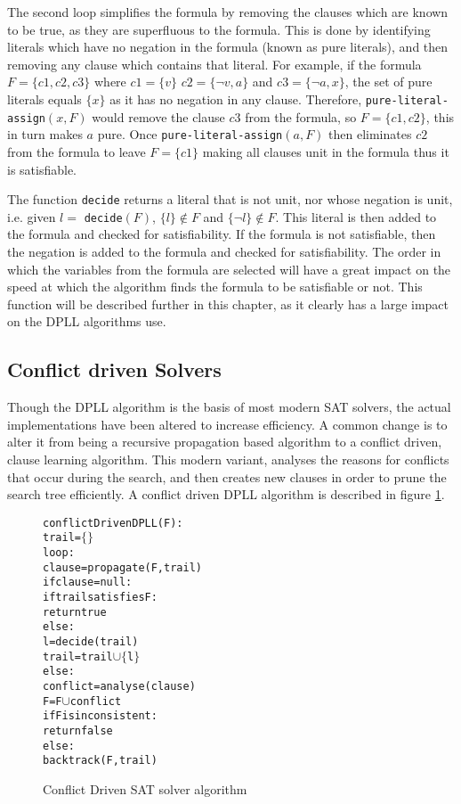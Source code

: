 The second loop simplifies the formula by removing the clauses which are known to be true, as they are superfluous to the formula.
This is done by identifying literals which have no negation in the formula (known as pure literals), and then removing any clause which contains that literal.
For example, if the formula $F = \{c1,c2,c3\}$ where $c1 = \{v\}$ $c2 = \{\neg v, a\}$ and $c3 = \{\neg a , x\}$, 
the set of pure literals equals $\{x\}$ as it has no negation in any clause.
Therefore, \verb+pure-literal-assign+$(x,F)$ would remove the clause $c3$ from the formula, so $F = \{c1,c2\}$, this in turn makes $a$ pure.
Once \verb+pure-literal-assign+$(a,F)$ then eliminates $c2$ from the formula to leave $F= \{c1\}$ making all clauses unit in the formula thus it is satisfiable.

The function \verb+decide+ returns a literal that is not unit, nor whose negation is unit, i.e. given $l =$ \verb+decide+$(F)$, $\{l\} \not \in F$ and $\{\neg l\} \not \in F$.
This literal is then added to the formula and checked for satisfiability.
If the formula is not satisfiable, then the negation is added to the formula and checked for satisfiability.  
The order in which the variables from the formula are selected will have a great impact on the speed at which the algorithm finds the formula to be satisfiable or not.
This function will be described further in this chapter, as it clearly has a large impact on the DPLL algorithms use.


\subsection{Conflict driven Solvers}
Though the DPLL algorithm is the basis of most modern SAT solvers, the actual implementations have been altered to increase efficiency.
A common change is to alter it from being a recursive propagation based algorithm to a conflict driven, clause learning algorithm.
This modern variant, analyses the reasons for conflicts that occur during the search, and then creates new clauses in order to prune the search tree efficiently.
A conflict driven DPLL algorithm is described in figure \ref{impl.conflictSAT}.

\begin{figure}[htp]
\begin{center}
\begin{alltt}
conflictDrivenDPLL(F):
    trail = \(\{\}\)
    loop:
        clause = propagate(F,trail)
        if clause = null:
            if trail satisfies F:
                return true
            else:
                l = decide(trail)
                trail = trail \(\cup \{ \) l \(\}\)
        else:
            conflict = analyse(clause)
            F = F \(\cup\) conflict
            if F is inconsistent:
                return false
            else:
                backtrack(F,trail)
			
\end{alltt}
  \caption{Conflict Driven SAT solver algorithm}
  \label{impl.conflictSAT}
\end{center}
\end{figure}

